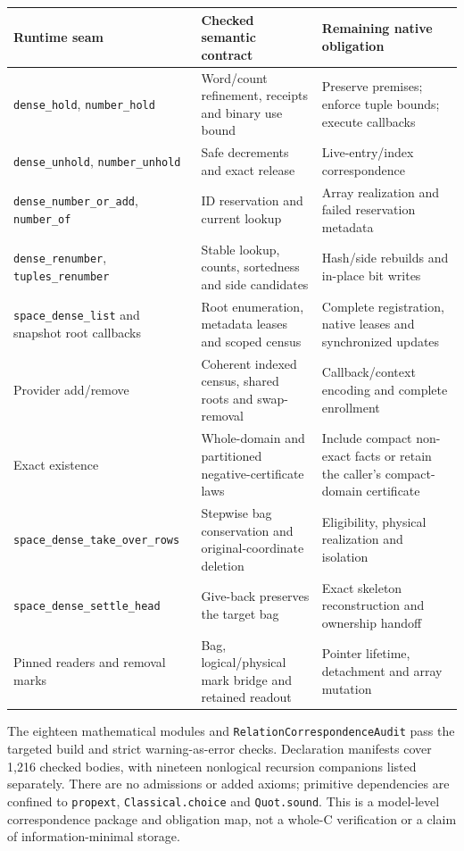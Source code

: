 \documentclass[11pt,a4paper]{article}
\newcommand{\code}[1]{\nolinkurl{#1}}
\begin{document}
\begin{center}
\small
\begin{tabularx}{\linewidth}{@{}>{\raggedright\arraybackslash}p{.27\linewidth}>{\raggedright\arraybackslash}X>{\raggedright\arraybackslash}X@{}}
\toprule
Runtime seam & Checked semantic contract & Remaining native obligation\\
\midrule
\code{dense_hold}, \code{number_hold} & Word/count refinement, receipts and binary use bound & Preserve premises; enforce tuple bounds; execute callbacks\\
\code{dense_unhold}, \code{number_unhold} & Safe decrements and exact release & Live-entry/index correspondence\\
\code{dense_number_or_add}, \code{number_of} & ID reservation and current lookup & Array realization and failed reservation metadata\\
\code{dense_renumber}, \code{tuples_renumber} & Stable lookup, counts, sortedness and side candidates & Hash/side rebuilds and in-place bit writes\\
\code{space_dense_list} and snapshot root callbacks & Root enumeration, metadata leases and scoped census & Complete registration, native leases and synchronized updates\\
Provider add/remove & Coherent indexed census, shared roots and swap-removal & Callback/context encoding and complete enrollment\\
Exact existence & Whole-domain and partitioned negative-certificate laws & Include compact non-exact facts or retain the caller's compact-domain certificate\\
\code{space_dense_take_over_rows} & Stepwise bag conservation and original-coordinate deletion & Eligibility, physical realization and isolation\\
\code{space_dense_settle_head} & Give-back preserves the target bag & Exact skeleton reconstruction and ownership handoff\\
Pinned readers and removal marks & Bag, logical/physical mark bridge and retained readout & Pointer lifetime, detachment and array mutation\\
\bottomrule
\end{tabularx}
\end{center}

The eighteen mathematical modules and \code{RelationCorrespondenceAudit} pass the
targeted build and strict warning-as-error checks. Declaration manifests cover
1,216 checked bodies, with nineteen nonlogical recursion companions listed
separately. There are no admissions or added axioms; primitive dependencies
are confined to \code{propext}, \code{Classical.choice} and \code{Quot.sound}.
This is a model-level correspondence package and obligation map, not a
whole-C verification or a claim of information-minimal storage.
\end{document}
